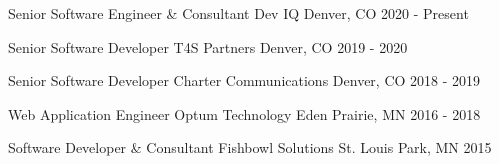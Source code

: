 

\begin{cventries}

  \cventry
    {Senior Software Engineer \& Consultant} %
    {Dev IQ} %
    {Denver, CO} %
    {2020 - Present} %
    {
    }

  \cventry
  {Senior Software Developer} %
  {T4S Partners} %
  {Denver, CO} %
  {2019 - 2020} %
  {
  }

  \cventry
  {Senior Software Developer} %
  {Charter Communications} %
  {Denver, CO} %
  {2018 - 2019} %
  {
  }

  \cventry
  {Web Application Engineer} %
  {Optum Technology} %
  {Eden Prairie, MN} %
  {2016 - 2018} %
  {
  }

  \cventry
  {Software Developer \& Consultant} %
  {Fishbowl Solutions} %
  {St. Louis Park, MN} %
  {2015} %
  {
  }
\end{cventries}
